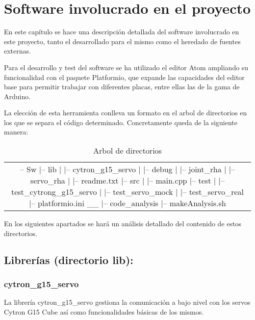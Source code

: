 \chapter{Software involucrado en el proyecto} \label{chap:SW}

    En este capítulo se hace una descripción detallada del software involucrado en este proyecto, tanto el desarrollado para el mismo como el heredado de fuentes externas.

    Para el desarrollo y test del software se ha utilizado el editor Atom ampliando su funcionalidad con el paquete Platformio, que expande las capacidades del editor base para permitir trabajar con diferentes placas, entre ellas las de la gama de Arduino.

    La elección de esta herramienta conlleva un formato en el arbol de directorios en los que se separa el código determinado. Concretamente queda de la siguiente manera:

    \begin{table}[tb]
    \caption{Arbol de directorios}
    \label{SW:tab:arbol_directorios}
    \begin{center}
    \begin{tabular}{|c|}
        \hline
        -- Sw
         |-- lib
         |  |-- cytron_g15_servo
         |  |-- debug
         |  |-- joint_rha
         |  |-- servo_rha
         |  |-- readme.txt
         |-- src
         |  |-- main.cpp
         |-- test
         |  |-- test_cytrong_g15_servo
         |  |-- test_servo_mock
         |  |-- test_servo_real
         |-- platformio.ini
         __
         |-- code_analysis
         |-- makeAnalysis.sh
        \hline
    \end{tabular}
    \end{center}
    \end{table}

    En los siguientes apartados se hará un análisis detallado del contenido de estos directorios.
\section{Librerías (directorio lib):} \label{sec:SW:lib}
    \subsection{cytron_g15_servo} \label{subsec:SW:lib:cytron}
        La librería cytron_g15_servo gestiona la comunicación a bajo nivel con los servos Cytron G15 Cube así como funcionalidades básicas de los mismos.

